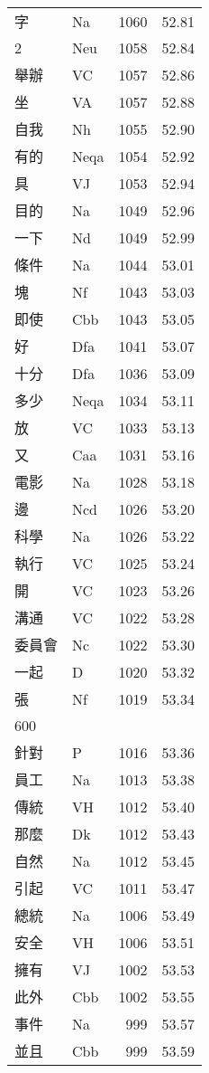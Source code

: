 \documentclass[twocolumn]{book}
\begin{document}
\begin{supertabular}{llrr}
字 & Na & 1060 &  52.81\\
2 & Neu & 1058 &  52.84\\
舉辦 & VC & 1057 &  52.86\\
坐 & VA & 1057 &  52.88\\
自我 & Nh & 1055 &  52.90\\
有的 & Neqa & 1054 &  52.92\\
具 & VJ & 1053 &  52.94\\
目的 & Na & 1049 &  52.96\\
一下 & Nd & 1049 &  52.99\\
條件 & Na & 1044 &  53.01\\
塊 & Nf & 1043 &  53.03\\
即使 & Cbb & 1043 &  53.05\\
好 & Dfa & 1041 &  53.07\\
十分 & Dfa & 1036 &  53.09\\
多少 & Neqa & 1034 &  53.11\\
放 & VC & 1033 &  53.13\\
又 & Caa & 1031 &  53.16\\
電影 & Na & 1028 &  53.18\\
邊 & Ncd & 1026 &  53.20\\
科學 & Na & 1026 &  53.22\\
執行 & VC & 1025 &  53.24\\
開 & VC & 1023 &  53.26\\
溝通 & VC & 1022 &  53.28\\
委員會 & Nc & 1022 &  53.30\\
一起 & D & 1020 &  53.32\\
張 & Nf & 1019 &  53.34\\
600\\
針對 & P & 1016 &  53.36\\
員工 & Na & 1013 &  53.38\\
傳統 & VH & 1012 &  53.40\\
那麼 & Dk & 1012 &  53.43\\
自然 & Na & 1012 &  53.45\\
引起 & VC & 1011 &  53.47\\
總統 & Na & 1006 &  53.49\\
安全 & VH & 1006 &  53.51\\
擁有 & VJ & 1002 &  53.53\\
此外 & Cbb & 1002 &  53.55\\
事件 & Na & 999 &  53.57\\
並且 & Cbb & 999 &  53.59\\

\end{supertabular}
\end{document}
